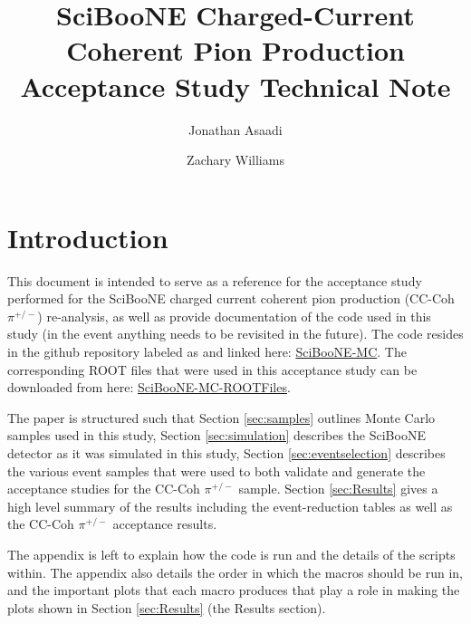 \documentclass[11pt]{article}
\title{SciBooNE Charged-Current Coherent Pion Production Acceptance Study Technical Note}
\author[1]{Jonathan Asaadi}
\author[1]{Zachary Williams}
\affil[1]{Department of Physics, The University of Texas at Arlington}
\begin{document}
\begin{minipage}[h]{\textwidth}
\maketitle


\end{minipage}



\section{Introduction}\label{sec:introduction}
This document is intended to serve as a reference for the acceptance study performed for the SciBooNE charged current coherent pion production (CC-Coh $\pi^{+/-}$) re-analysis, as well as provide documentation of the code used in this study (in the event anything needs to be revisited in the future). The code resides in the github repository labeled as and linked here: \href{https://github.com/williamszg/SciBooNE-MC}{SciBooNE-MC}. The corresponding ROOT files that were used in this acceptance study can be downloaded from here: \href{https://drive.google.com/open?id=0B4rvJl9swUOxcEtpSl94RDRsc3c}{SciBooNE-MC-ROOTFiles}.

The paper is structured such that Section \ref*{sec:samples} outlines Monte Carlo samples used in this study, Section \ref*{sec:simulation} describes the SciBooNE detector as it was simulated in this study, Section \ref*{sec:eventselection} describes the various event samples that were used to both validate and generate the acceptance studies for the CC-Coh $\pi^{+/-}$ sample. Section \ref*{sec:Results} gives a high level summary of the results including the event-reduction tables as well as the CC-Coh $\pi^{+/-}$ acceptance results.

The appendix is left to explain how the code is run and the details of the scripts within. The appendix also details the order in which the macros should be run in, and the important plots that each macro produces that play a role in making the plots shown in Section \ref*{sec:Results} (the Results section).
\end{document}
